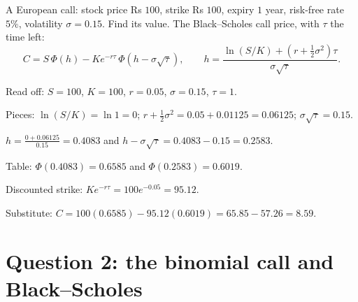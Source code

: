 \begin{problem}[Q1(j)]
A European call: stock price Rs $100$, strike Rs $100$, expiry $1$ year, risk-free rate $5\%$, volatility $\sigma=0.15$. Find its value.
\cardsays The Black--Scholes call price, with $\tau$ the time left:
\[
C=S\,\Phi(h)-Ke^{-r\tau}\,\Phi(h-\sigma\sqrt\tau),\qquad h=\frac{\ln(S/K)+(r+\frac12\sigma^2)\tau}{\sigma\sqrt\tau}.
\]
\working
\begin{steps}
\item Read off: $S=100$, $K=100$, $r=0.05$, $\sigma=0.15$, $\tau=1$.
\item Pieces: $\ln(S/K)=\ln1=0$; $r+\frac12\sigma^2=0.05+0.01125=0.06125$; $\sigma\sqrt\tau=0.15$.
\item $h=\frac{0+0.06125}{0.15}=0.4083$ and $h-\sigma\sqrt\tau=0.4083-0.15=0.2583$.
\item Table: $\Phi(0.4083)=0.6585$ and $\Phi(0.2583)=0.6019$.
\item Discounted strike: $Ke^{-r\tau}=100e^{-0.05}=95.12$.
\item Substitute: $C=100(0.6585)-95.12(0.6019)=65.85-57.26=8.59$.
\end{steps}
\end{problem}

\section{Question 2: the binomial call and Black--Scholes}

